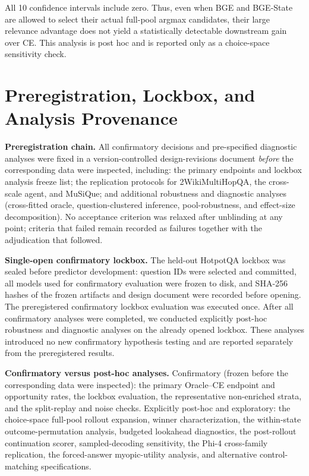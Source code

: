 \documentclass[10pt]{article}
\newcommand{\stitle}[1]{\vspace{0.4em}\noindent\textbf{#1}\hspace{0.6em}}
\begin{document}
\noindent
All 10 confidence intervals include zero. Thus, even when BGE and BGE-State
are allowed to select their actual full-pool argmax candidates, their large
relevance advantage does not yield a statistically detectable downstream gain
over CE. This analysis is post hoc and is reported only as a choice-space
sensitivity check.

\section{Preregistration, Lockbox, and Analysis Provenance}
\label{sec:prereg}

\stitle{Preregistration chain.}
All confirmatory decisions and pre-specified diagnostic analyses were fixed
in a version-controlled design-revisions document \emph{before} the
corresponding data were inspected, including: the primary endpoints and
lockbox analysis freeze list; the replication protocols for
2WikiMultiHopQA, the cross-scale agent, and MuSiQue; and additional
robustness and diagnostic analyses (cross-fitted oracle, question-clustered
inference, pool-robustness, and effect-size decomposition).
No acceptance criterion was relaxed after unblinding at any point; criteria
that failed remain recorded as failures together with the adjudication that
followed.

\stitle{Single-open confirmatory lockbox.}
The held-out HotpotQA lockbox was sealed before predictor development:
question IDs were selected and committed, all models used for confirmatory
evaluation were frozen to disk, and SHA-256 hashes of the frozen artifacts and
design document were recorded before opening. The preregistered confirmatory
lockbox evaluation was executed once. After all confirmatory analyses were
completed, we conducted explicitly post-hoc robustness and diagnostic
analyses on the already opened lockbox. These analyses introduced no new
confirmatory hypothesis testing and are reported separately from the
preregistered results.

\stitle{Confirmatory versus post-hoc analyses.}
Confirmatory (frozen before the corresponding data were inspected): the
primary Oracle--CE endpoint and opportunity rates, the lockbox evaluation,
the representative non-enriched strata, and the split-replay and noise
checks. Explicitly post-hoc and exploratory: the choice-space full-pool
rollout expansion, winner characterization, the within-state
outcome-permutation analysis, budgeted lookahead diagnostics, the
post-rollout continuation scorer, sampled-decoding sensitivity, the Phi-4
cross-family replication, the forced-answer myopic-utility analysis, and
alternative control-matching specifications.
\end{document}
